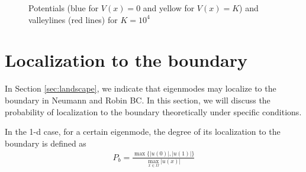 \documentclass[12pt,a4paper]{article}
\begin{document}
\begin{figure}[h]
\centering
{}
\caption{Potentials (blue for $V(x) = 0$ and yellow for $V(x) = K$) and valleylines (red lines) for $K = 10^4$}
\label{fig:6}
\end{figure}

\section{Localization to the boundary}\label{sec:probability}

In Section \ref{sec:landscape}, we indicate that eigenmodes may localize to the boundary in Neumann and Robin BC. In this section, we will discuss the probability of localization to the boundary theoretically under specific conditions.

In the 1-d case, for a certain eigenmode, the degree of its localization to the boundary is defined as
\begin{align}
P_b = \frac{\max\{|u(0)|, |u(1)|\}}{\max_{x \in \Omega} |u(x)|}
\end{align}
\end{document}
